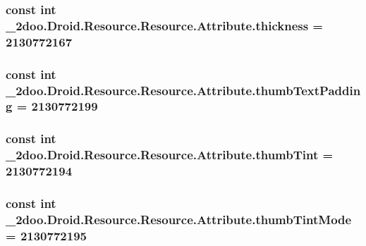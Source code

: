 \hypertarget{class__2doo_1_1_droid_1_1_resource_1_1_attribute_04c4d707b2cdb985a16cb82242514725}{
\subsubsection[{thickness}]{\setlength{\rightskip}{0pt plus 5cm}const int \_\-2doo.Droid.Resource.Resource.Attribute.thickness = 2130772167}}
\label{class__2doo_1_1_droid_1_1_resource_1_1_attribute_04c4d707b2cdb985a16cb82242514725}


\hypertarget{class__2doo_1_1_droid_1_1_resource_1_1_attribute_af17ca18019f381d3b9d21844a07d548}{
\subsubsection[{thumbTextPadding}]{\setlength{\rightskip}{0pt plus 5cm}const int \_\-2doo.Droid.Resource.Resource.Attribute.thumbTextPadding = 2130772199}}
\label{class__2doo_1_1_droid_1_1_resource_1_1_attribute_af17ca18019f381d3b9d21844a07d548}


\hypertarget{class__2doo_1_1_droid_1_1_resource_1_1_attribute_cc55c8033aacf3ebed0a06e381a91b84}{
\subsubsection[{thumbTint}]{\setlength{\rightskip}{0pt plus 5cm}const int \_\-2doo.Droid.Resource.Resource.Attribute.thumbTint = 2130772194}}
\label{class__2doo_1_1_droid_1_1_resource_1_1_attribute_cc55c8033aacf3ebed0a06e381a91b84}


\hypertarget{class__2doo_1_1_droid_1_1_resource_1_1_attribute_854e605b8d7aabd36a9af080f3e4cb03}{
\subsubsection[{thumbTintMode}]{\setlength{\rightskip}{0pt plus 5cm}const int \_\-2doo.Droid.Resource.Resource.Attribute.thumbTintMode = 2130772195}}
\label{class__2doo_1_1_droid_1_1_resource_1_1_attribute_854e605b8d7aabd36a9af080f3e4cb03}


